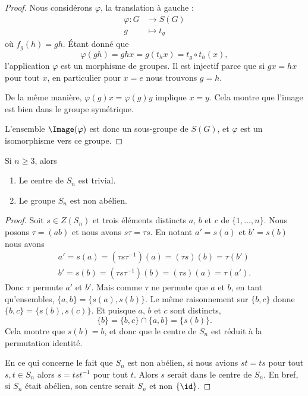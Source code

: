 \begin{proof}
	Nous considérons \( \varphi\), la translation à gauche :
	\begin{equation}
		\begin{aligned}
			\varphi\colon G & \to S(G)    \\
			g               & \mapsto t_g
		\end{aligned}
	\end{equation}
	où \( f_g(h)=gh\). Étant donné que
	\begin{equation}
		\varphi(gh)= ghx=g(t_hx)=t_g\circ t_h(x),
	\end{equation}
	l'application \( \varphi\) est un morphisme de groupes. Il est injectif parce que si \( gx=hx\) pour tout \( x\), en particulier pour \( x=e\) nous trouvons \( g=h\).

	De la même manière, \( \varphi(g)x=\varphi(g)y\) implique \( x=y\). Cela montre que l'image est bien dans le groupe symétrique.

	L'ensemble \( \Image(\varphi)\) est donc un sous-groupe de \( S(G)\), et \( \varphi\) est un isomorphisme vers ce groupe.
\end{proof}

\begin{lemma}       \label{LEMooMVUGooRiDaDz}
	Si \( n\geq 3\), alors
	\begin{enumerate}
		\item
		      Le centre de \( S_n\) est trivial.
		\item
		      Le groupe \( S_n\) est non abélien.
	\end{enumerate}
\end{lemma}

\begin{proof}
	Soit \( s\in Z(S_n)\) et trois éléments distincts \( a\),  \( b\) et \( c\) de \( \{ 1,\ldots, n \}\). Nous posons \( \tau=(ab)\) et nous avons \( s\tau=\tau s\). En notant \( a'=s(a)\) et \( b'=s(b)\) nous avons
	\begin{subequations}
		\begin{align}
			a'=s(a)=(\tau s\tau^{-1})(a)=(\tau s)(b)=\tau(b') \\
			b'=s(b)=(\tau s\tau^{-1})(b)=(\tau s)(a)=\tau(a').
		\end{align}
	\end{subequations}
	Donc \( \tau\) permute \( a'\) et \( b'\). Mais comme \( \tau\) ne permute que \( a\) et \( b\), en tant qu'ensembles, \( \{ a,b \}=\{ s(a), s(b) \}\). Le même raisonnement sur \( \{ b,c \}\) donne $\{ b,c \}=\{ s(b),s(c) \}$. Et puisque \( a\), \( b\) et \( c\) sont distincts,
	\begin{equation}
		\{ b \}=\{ b,c \}\cap\{ a,b \}=\{ s(b) \}.
	\end{equation}
	Cela montre que \( s(b)=b\), et donc que le centre de \( S_n\) est réduit à la permutation identité.

	En ce qui concerne le fait que \( S_n\) est non abélien, si nous avions \( st=ts\) pour tout \( s,t\in S_n\) alors \( s=tst^{-1}\) pour tout \( t\). Alors \( s\) serait dans le centre de \( S_n\). En bref, si \( S_n\) était abélien, son centre serait \( S_n\) et non \( \{ \id \}\).

\end{proof}

